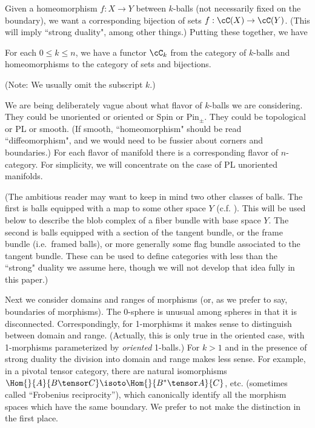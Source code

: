 Given a homeomorphism $f:X\to Y$ between $k$-balls (not necessarily fixed on 
the boundary), we want a corresponding
bijection of sets $f:\cC(X)\to \cC(Y)$.
(This will imply ``strong duality", among other things.) Putting these together, we have

\begin{axiom}[Morphisms]
\label{axiom:morphisms}
For each $0 \le k \le n$, we have a functor $\cC_k$ from 
the category of $k$-balls and 
homeomorphisms to the category of sets and bijections.
\end{axiom}


(Note: We usually omit the subscript $k$.)

We are being deliberately vague about what flavor of $k$-balls
we are considering.
They could be unoriented or oriented or Spin or $\mbox{Pin}_\pm$.
They could be topological or PL or smooth.
(If smooth, ``homeomorphism" should be read ``diffeomorphism", and we would need
to be fussier about corners and boundaries.)
For each flavor of manifold there is a corresponding flavor of $n$-category.
For simplicity, we will concentrate on the case of PL unoriented manifolds.

(The ambitious reader may want to keep in mind two other classes of balls.
The first is balls equipped with a map to some other space $Y$ (c.f. \cite{MR2079378}). 
This will be used below to describe the blob complex of a fiber bundle with
base space $Y$.
The second is balls equipped with a section of the tangent bundle, or the frame
bundle (i.e.\ framed balls), or more generally some flag bundle associated to the tangent bundle.
These can be used to define categories with less than the ``strong" duality we assume here,
though we will not develop that idea fully in this paper.)

Next we consider domains and ranges of morphisms (or, as we prefer to say, boundaries
of morphisms).
The 0-sphere is unusual among spheres in that it is disconnected.
Correspondingly, for 1-morphisms it makes sense to distinguish between domain and range.
(Actually, this is only true in the oriented case, with 1-morphisms parameterized
by {\it oriented} 1-balls.)
For $k>1$ and in the presence of strong duality the division into domain and range makes less sense.
For example, in a pivotal tensor category, there are natural isomorphisms $\Hom{}{A}{B \tensor C} \isoto \Hom{}{B^* \tensor A}{C}$, etc. 
(sometimes called ``Frobenius reciprocity''), which canonically identify all the morphism spaces which have the same boundary.
We prefer to not make the distinction in the first place.

